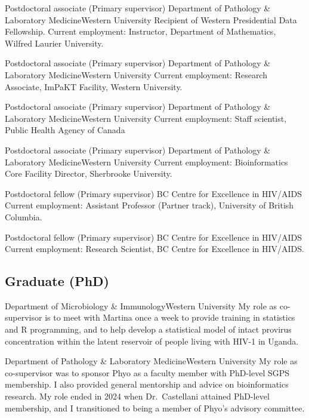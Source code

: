 {Postdoctoral associate (Primary supervisor)}
{Department of Pathology \& Laboratory Medicine}{Western University}
{Recipient of Western Presidential Data Fellowship.  Current employment: Instructor, Department of Mathematics, Wilfred Laurier University.}


{Postdoctoral associate (Primary supervisor)}
{Department of Pathology \& Laboratory Medicine}{Western University}
{Current employment: Research Associate, ImPaKT Facility, Western University.}


{Postdoctoral associate (Primary supervisor)}
{Department of Pathology \& Laboratory Medicine}{Western University}
{Current employment: Staff scientist, Public Health Agency of Canada}


{Postdoctoral associate (Primary supervisor)}
{Department of Pathology \& Laboratory Medicine}{Western University}
{Current employment: Bioinformatics Core Facility Director, Sherbrooke University.}

{Postdoctoral fellow (Primary supervisor)}
{BC Centre for Excellence in HIV/AIDS}{}
{Current employment: Assistant Professor (Partner track), University of British Columbia.}

{Postdoctoral fellow (Primary supervisor)}
{BC Centre for Excellence in HIV/AIDS}{}
{Current employment: Research Scientist, BC Centre for Excellence in HIV/AIDS.}



\subsection {Graduate (PhD)}

{Department of Microbiology \& Immunology}{Western University}
{My role as co-supervisor is to meet with Martina once a week to provide training in statistics and R programming, and to help develop a statistical model of intact provirus concentration within the latent reservoir of people living with HIV-1 in Uganda.}

{Department of Pathology \& Laboratory Medicine}{Western University}
{My role as co-supervisor was to sponsor Phyo as a faculty member with PhD-level SGPS membership.  I also provided general mentorship and advice on bioinformatics research.  My role ended in 2024 when Dr.~Castellani attained PhD-level membership, and I transitioned to being a member of Phyo's advisory committee.}

